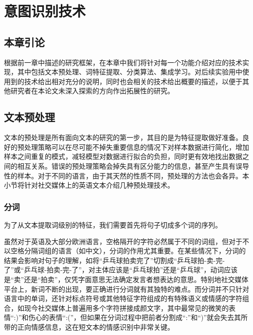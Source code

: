 \chapter{意图识别技术}
\label{cha:tech}

\section{本章引论}

根据前一章中描述的研究框架，在本章中我们将针对每一个功能介绍对应的技术实现，其中包括文本预处理、词特征提取、分类算法、集成学习。对后续实验用中使用到的技术给出相对充分的说明，同时也会相关的技术给出概要的描述，以便于其他研究者在本论文未深入探索的方向作出拓展性的研究。

\section{文本预处理}

文本的预处理是所有面向文本的研究的第一步，其目的是为特征提取做好准备。良好的预处理策略可以在尽可能不掉失重要信息的情况下对样本数据进行简化，增加样本之间重复的模式，减轻模型对数据进行拟合的负担，同时更有效地找出数据之间的相互关系。错误的预处理策略会掉失具有区分能力的信息，甚至产生具有误导性的样本。对于不同的语言，由于其天然的性质不同，预处理的方法也会各异。本小节将针对社交媒体上的英语文本介绍几种预处理技术。

\subsection{分词}
\label{ssec:tokenization}

为了从文本提取词级别的特征，我们需要首先将句子切成多个词的序列。

虽然对于英语及大部分欧洲语言，空格隔开的字符必然属于不同的词组，但对于不以空格分隔词组的语言（如中文），分词的作用尤其重要。在某些情况下，分词的结果会影响对句子的理解，如将“乒乓球拍卖完了”切割成“乒乓球拍-卖-完-了”或“乒乓球-拍卖-完-了”，对主体应该是“乒乓球拍”还是“乒乓球”，动词应该是“卖”还是“拍卖”，仅凭字面意思无法确定发言者想表达的意思。特别地社交媒体平台上，新词不断的出现，要正确进行分词就有其独特的难点。而分词并不只针对语言中的单词，还针对标点符号或其他特征字符组成的有特殊语义或情感的字符组合，如现今社交媒体上普遍用多个字符拼接成颜文字，其中最常见的微笑的表情“:)”和伤心的表情“:(”，但如果在分词过程中把前者分割成“:”和“)”就会失去其所带的正向情感信息，这在短文本的情感识别中非常关键。

